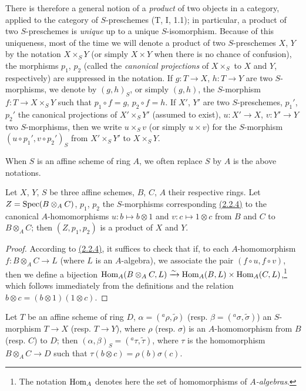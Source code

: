 There is therefore a general notion of a {\it product} of two objects in a category, applied
to the category of $S$-preschemes (T, I, 1.1); in particular, a product of two $S$-preschemes
is {\it unique} up to a unique $S$-isomorphism. Because of this uniqueness, most of the time
we will denote a product of two $S$-preschemes $X$, $Y$ by the notation $X\times_S Y$ (or
simply $X\times Y$ when there is no chance of confusion), the morphisms $p_1$, $p_2$ (called
the {\it canonical projections} of $X\times_S$ to $X$ and $Y$, respectively) are suppressed
in the notation. If $g:T\to X$, $h:T\to Y$ are two $S$-morphisms, we denote by $(g,h)_S$, or
simply $(g,h)$, the $S$-morphism $f:T\to X\times_S Y$ such that $p_1\circ f=g$,
$p_2\circ f=h$. If $X'$, $Y'$ are two $S$-preschemes, $p_1'$, $p_2'$ the canonical
projections of $X'\times_S Y'$ (assumed to exist), $u:X'\to X$, $v:Y'\to Y$ two
$S$-morphisms, then we write $u\times_S v$ (or simply $u\times v$) for the $S$-morphism
$(u\circ p_1',v\circ p_2')_S$ from $X'\times_S Y'$ to $X\times_S Y$.

When $S$ is an affine scheme of ring $A$, we often replace $S$
by $A$ is the above notations.

\begin{prop}[3.2.2]
\label{prop-1.3.2.2}
Let $X$, $Y$, $S$ be three affine schemes, $B$, $C$, $A$ their respective rings. Let
$Z={\mathop{\mathrm{Spec}}\nolimits}(B\otimes_A C)$, $p_1$, $p_2$ the $S$-morphisms corresponding \hyperref[prop-1.2.2.4]{(2.2.4)} to
the canonical $A$-homomorphisms $u:b\mapsto b\otimes 1$ and $v:c\mapsto 1\otimes c$ from $B$
and $C$ to $B\otimes_A C$; then $(Z,p_1,p_2)$ is a product of $X$ and $Y$.
\end{prop}

\begin{proof}
\label{proof-prop-1.3.2.2}
According to \hyperref[prop-1.2.2.4]{(2.2.4)}, it suffices to check that if, to each $A$-homomorphism
$f:B\otimes_A C\to L$ (where $L$ is an $A$-algebra), we associate the pair
$(f\circ u,f\circ v)$, then we define a bijection
${\mathop{\mathrm{Hom}}\nolimits}_A(B\otimes_A C,L)\xrightarrow{\sim}{\mathop{\mathrm{Hom}}\nolimits}_A(B,L)\times{\mathop{\mathrm{Hom}}\nolimits}_A(C,L)$,\footnote{The notation ${\mathop{\mathrm{Hom}}\nolimits}_A$
denotes here the set of homomorphisms of {\it $A$-algebras}.} which follows immediately
from the definitions and the relation $b\otimes c=(b\otimes 1)(1\otimes c)$.
\end{proof}

\begin{cor}[3.2.3]
\label{cor-1.3.2.3}
Let $T$ be an affine scheme of ring $D$, $\alpha=({}^a\rho,\widetilde{\rho})$
(resp. $\beta=({}^a\sigma,\widetilde{\sigma})$) an $S$-morphism $T\to X$ (resp. $T\to Y$),
where $\rho$ (resp. $\sigma$) is an $A$-homomorphism from $B$ (resp. $C$) to $D$; then
$(\alpha,\beta)_S=({}^a\tau,\widetilde{\tau})$, where $\tau$ is the homomorphism
$B\otimes_A C\to D$ such that $\tau(b\otimes c)=\rho(b)\sigma(c)$.
\end{cor}

